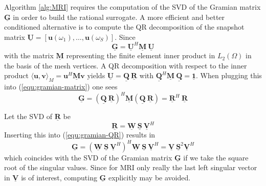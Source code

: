 \documentclass[11pt, a4paper]{article}
\begin{document}
Algorithm \ref{alg:MRI} requires the computation of the \acrfull{SVD}
of the Gramian matrix $\mathbf{\underline{G}}$ in order to build the rational
surrogate. A more efficient and better conditioned \cite{davidePHD} alternative is to compute
the QR decomposition of the snapshot matrix $\mathbf{\underline{U}} = [\mathbf{u}(\omega_1), \dots, \mathbf{u}(\omega_S)]$.
Since
\begin{equation}
    \mathbf{\underline{G}} = \mathbf{\underline{U}}^H \mathbf{\underline{M}}~\mathbf{\underline{U}} \label{equ:gramian-matrix}
\end{equation}
with the matrix $\mathbf{\underline{M}}$ representing the finite element 
inner product in $L_2(\Omega)$ in the basis of the mesh vertices.
A QR decomposition with respect to the inner product
$\langle \mathbf{u}, \mathbf{v} \rangle_M = \mathbf{u}^H \mathbf{\underline{M}} \mathbf{v}$
yields $\mathbf{\underline{U}} = \mathbf{\underline{Q}}~\mathbf{\underline{R}}$
with $\mathbf{\underline{Q}}^H \mathbf{\underline{M}}~\mathbf{\underline{Q}} = \boldsymbol{\underline{1}}$.
When plugging this into (\ref{equ:gramian-matrix}) one sees
\begin{equation}
    \mathbf{\underline{G}} = (\mathbf{\underline{Q}}~\mathbf{\underline{R}})^H \mathbf{\underline{M}} 
    (\mathbf{\underline{Q}}~\mathbf{\underline{R}}) = \mathbf{\underline{R}}^H~\mathbf{\underline{R}}
    \label{equ:gramian-QR}
\end{equation}

Let the \acrshort{SVD} of $\mathbf{\underline{R}}$ be 
\begin{equation}
    \mathbf{\underline{R}} = \mathbf{\underline{W}}~\mathbf{\underline{S}}~\mathbf{\underline{V}}^H \label{equ:qr-decomposition}
\end{equation}
Inserting this into (\ref{equ:gramian-QR}) results in
\begin{equation}
    \mathbf{\underline{G}} = (\mathbf{\underline{W}}~\mathbf{\underline{S}}~\mathbf{\underline{V}}^H)^H \mathbf{\underline{W}}~\mathbf{\underline{S}}~\mathbf{\underline{V}}^H
    = \mathbf{\underline{V}}~\mathbf{\underline{S}}^2\mathbf{\underline{V}}^H
    \label{equ:gramian-SVD}
\end{equation}
which coincides with the \acrshort{SVD} of the Gramian matrix $\mathbf{\underline{G}}$
if we take the square root of the singular values. Since for \acrshort{MRI} only
really the last left singular vector in $\mathbf{\underline{V}}$ is of interest,
computing $\mathbf{\underline{G}}$ explicitly may be avoided.
\end{document}
